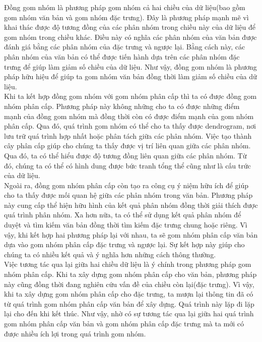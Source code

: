 \hspace*{10mm}Đồng gom nhóm là phương pháp gom nhóm cả hai chiều của dữ liệu(bao gồm gom nhóm văn bản và gom nhóm đặc trưng). Đây là phương pháp mạnh mẽ vì khai thác được độ tương đồng của các phân nhóm trong chiều này của dữ liệu để gom nhóm trong chiều khác. Điều này có nghĩa các phân nhóm của văn bản được đánh giá bằng các phân nhóm của đặc trưng và ngược lại. Bằng cách này, các phân nhóm của văn bản có thể được tiến hành dựa trên các phân nhóm đặc trưng để giúp làm giảm số chiều của dữ liệu. Như vậy, đồng gom nhóm là phương pháp hữu hiệu để giúp ta gom nhóm văn bản đồng thời làm giảm số chiều của dữ liệu.\\

\hspace*{10mm}Khi ta kết hợp đồng gom nhóm với gom nhóm phân cấp thì ta có được đồng gom nhóm phân cấp. Phương pháp này không những cho ta có được những điểm mạnh của đồng gom nhóm mà đồng thời còn có được điểm  mạnh của gom nhóm phân cấp. Qua đó, quá trình gom nhóm có thể cho ta thấy được dendrogram, nơi lưu trữ quá trình hợp nhất hoặc phân tách giữa các phân nhóm. Việc tạo thành cây phân cấp giúp cho chúng ta thấy được vị trí liên quan giữa các phân nhóm. Qua đó, ta có thể hiểu được độ tương đồng liên quan giữa các phân nhóm. Từ đó, chúng ta có thể có hình dung được bức tranh tổng thể cũng như là cấu trức của dữ liệu.\\

\hspace*{10mm}Ngoài ra, đồng gom nhóm phân cấp còn tạo ra công cụ ý niệm hữu ích để giúp cho ta thấy được mối quan hệ giữa các phân nhóm trong văn bản. Phương pháp này cung cấp thể hiện hữu hình của kết quả phân nhóm đồng thời giải thích được quá trình phân nhóm. Xa hơn nữa, ta có thể sử dụng kết quả phân nhóm để duyệt và tìm kiếm văn bản đồng thời tìm kiếm đặc trưng chung hoặc riêng. Vì vậy, khi kết hợp hai phương pháp lại với nhau, ta sẽ gom nhóm phân cấp văn bản dựa vào gom nhóm phân cấp đặc trưng và ngược lại. Sự kết hợp này giúp cho chúng ta có nhiều kết quả và ý nghĩa hơn những cách thông thường.\\

\hspace*{10mm}Việc tương tác qua lại giữa hai chiều dữ liệu là ý chính trong phương pháp gom nhóm phân cấp. Khi ta xây dựng gom nhóm phân cấp cho văn bản, phương pháp này cũng đồng thời đang nghiên cứu vấn đề của chiều còn lại(đặc trưng). Vì vậy, khi ta xây dựng gom nhóm phân cấp cho đặc trưng, ta mượn lại thông tin đã có từ quá trình gom nhóm phân cấp văn bản để xây dựng. Quá trình này lặp đi lặp lại cho đến khi kết thúc. Như vậy, nhờ có sự tương tác qua lại giữa hai quá trình gom nhóm phân cấp văn bản và gom nhóm phân cấp đặc trưng mà ta mới có được nhiều ích lợi trong quá trình gom nhóm.\\

